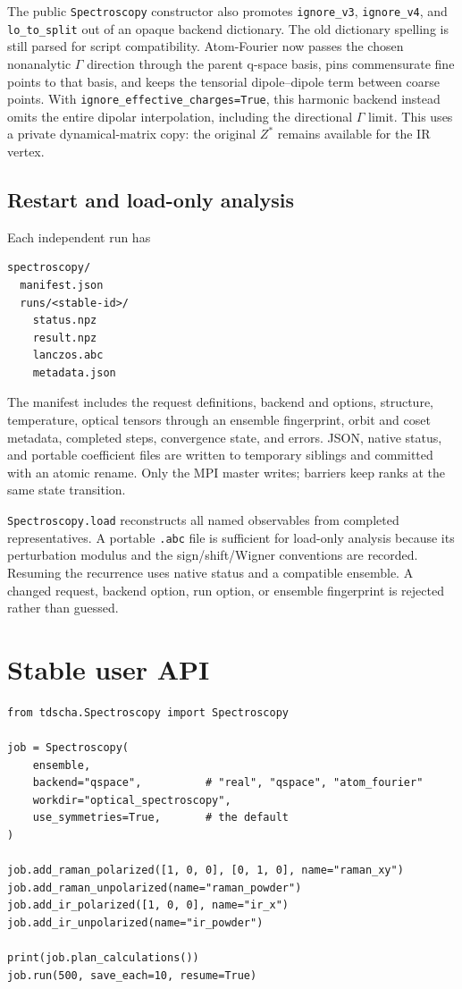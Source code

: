 \documentclass[11pt,a4paper]{article}
\begin{document}
The public \texttt{Spectroscopy} constructor also promotes
\texttt{ignore\_v3}, \texttt{ignore\_v4}, and \texttt{lo\_to\_split} out of
an opaque backend dictionary.  The old dictionary spelling is still parsed
for script compatibility.  Atom-Fourier now passes the chosen nonanalytic
$\Gamma$ direction through the parent q-space basis, pins commensurate fine
points to that basis, and keeps the tensorial dipole--dipole term between
coarse points.  With \texttt{ignore\_effective\_charges=True}, this harmonic
backend instead omits the entire dipolar interpolation, including the
directional $\Gamma$ limit.  This uses a private dynamical-matrix copy: the
original $Z^*$ remains available for the IR vertex.

\subsection{Restart and load-only analysis}

Each independent run has
\begin{verbatim}
spectroscopy/
  manifest.json
  runs/<stable-id>/
    status.npz
    result.npz
    lanczos.abc
    metadata.json
\end{verbatim}
The manifest includes the request definitions, backend and options, structure,
temperature, optical tensors through an ensemble fingerprint, orbit and coset
metadata, completed steps, convergence state, and errors.  JSON, native
status, and portable coefficient files are written to temporary siblings and
committed with an atomic rename.  Only the MPI master writes; barriers keep
ranks at the same state transition.

\texttt{Spectroscopy.load} reconstructs all named observables from completed
representatives.  A portable \texttt{.abc} file is sufficient for load-only
analysis because its perturbation modulus and the sign/shift/Wigner
conventions are recorded.  Resuming the recurrence uses native status and a
compatible ensemble.  A changed request, backend option, run option, or
ensemble fingerprint is rejected rather than guessed.

\section{Stable user API}
\label{sec:api}

\begin{lstlisting}
from tdscha.Spectroscopy import Spectroscopy

job = Spectroscopy(
    ensemble,
    backend="qspace",          # "real", "qspace", "atom_fourier"
    workdir="optical_spectroscopy",
    use_symmetries=True,       # the default
)

job.add_raman_polarized([1, 0, 0], [0, 1, 0], name="raman_xy")
job.add_raman_unpolarized(name="raman_powder")
job.add_ir_polarized([1, 0, 0], name="ir_x")
job.add_ir_unpolarized(name="ir_powder")

print(job.plan_calculations())
job.run(500, save_each=10, resume=True)
\end{lstlisting}
\end{document}
